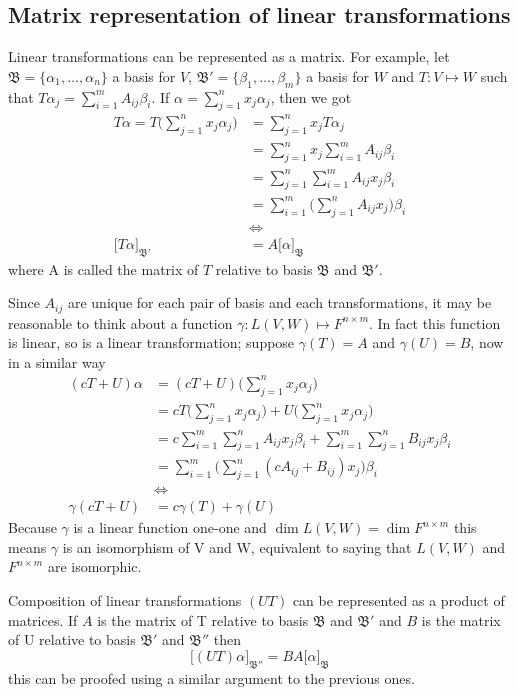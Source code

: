 \documentclass[../../../main.tex]{subfiles}
\begin{document}
\subsection{Matrix representation of linear transformations}
Linear transformations can be represented as a matrix. For example, let $\mathfrak{B}=\{\alpha_1,\dots,\alpha_n\}$ a basis for $V$, $\mathfrak{B}'=\{\beta_1,\dots,\beta_m\}$ a basis for $W$ and $T:V\mapsto W$ such that $T\alpha_j=\sum_{i=1}^m A_{ij}\beta_i$. If $\alpha=\sum_{j=1}^n x_j\alpha_j$, then we got
\begin{align*}
    T\alpha = T\Big(\sum_{j=1}^n x_j \alpha_j\Big)
    &=\sum_{j=1}^n x_j T\alpha_j\\
    &=\sum_{j=1}^n x_j \sum_{i=1}^m A_{ij}\beta_i\\
    &=\sum_{j=1}^n \sum_{i=1}^m A_{ij}x_j\beta_i\\
    &=\sum_{i=1}^m \Big(\sum_{j=1}^n A_{ij}x_j\Big)\beta_i\\
    &\Longleftrightarrow\\
    \big[T\alpha\big]_\mathfrak{B'}&=
    A\big[\alpha\big]_\mathfrak{B}
\end{align*}
where A is called the matrix of $T$ relative to basis $\mathfrak{B}$ and $\mathfrak{B'}$. 

Since $A_{ij}$ are unique for each pair of basis and each transformations, it may be reasonable to think about a function $\gamma:L(V,W)\mapsto F^{n\times m}$. In fact this function is linear, so is a linear transformation; suppose $\gamma(T) = A$ and $\gamma(U) = B$, now in a similar way
\begin{align*}
    (cT+U)\alpha &= (cT+U)\Big(\sum_{j=1}^n x_j \alpha_j\Big)\\
    &=cT\Big(\sum_{j=1}^n x_j \alpha_j\Big) + U\Big(\sum_{j=1}^n x_j \alpha_j\Big)\\
    &=c\sum_{i=1}^m\sum_{j=1}^n A_{ij}x_j\beta_i + \sum_{i=1}^m \sum_{j=1}^n B_{ij}x_j\beta_i\\
    &=\sum_{i=1}^m\Big(\sum_{j=1}^n (cA_{ij} + B_{ij})x_j\Big)\beta_i\\
    &\Longleftrightarrow\\
    \gamma(cT+U)&=c\gamma(T)+\gamma(U)
\end{align*}
Because $\gamma$ is a linear function one-one and $\dim L(V,W) = \dim F^{n\times m}$ this means $\gamma$ is an isomorphism of V and W, equivalent to saying that $L(V,W)$ and $F^{n\times m}$ are isomorphic.

Composition of linear transformations $(UT)$ can be represented as a product of matrices. If $A$ is the matrix of T relative to basis $\mathfrak{B}$ and $\mathfrak{B'}$ and $B$ is the matrix of U relative to basis $\mathfrak{B'}$ and $\mathfrak{B''}$ then
\begin{equation*}
    \big[(UT)\alpha\big]_\mathfrak{B''}=
    BA\big[\alpha\big]_\mathfrak{B}
\end{equation*}
this can be proofed using a similar argument to the previous ones.
\end{document}
